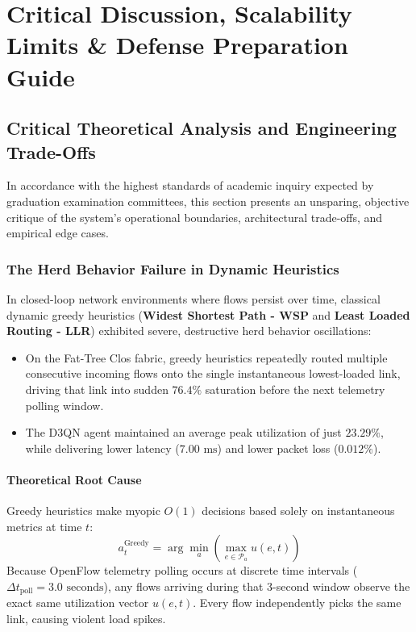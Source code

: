 \chapter{Critical Discussion, Scalability Limits \& Defense Preparation Guide}
\label{chap:defense}

\section{Critical Theoretical Analysis and Engineering Trade-Offs}
In accordance with the highest standards of academic inquiry expected by graduation examination committees, this section presents an unsparing, objective critique of the system's operational boundaries, architectural trade-offs, and empirical edge cases.

\subsection{The Herd Behavior Failure in Dynamic Heuristics}
In closed-loop network environments where flows persist over time, classical dynamic greedy heuristics (\textbf{Widest Shortest Path - WSP} and \textbf{Least Loaded Routing - LLR}) exhibited severe, destructive herd behavior oscillations:
\begin{itemize}
    \item On the Fat-Tree Clos fabric, greedy heuristics repeatedly routed multiple consecutive incoming flows onto the single instantaneous lowest-loaded link, driving that link into sudden $76.4\%$ saturation before the next telemetry polling window.
    \item The D3QN agent maintained an average peak utilization of just \textbf{$23.29\%$}, while delivering lower latency ($7.00\text{ ms}$) and lower packet loss ($0.012\%$).
\end{itemize}

\subsubsection{Theoretical Root Cause}
Greedy heuristics make myopic $O(1)$ decisions based solely on instantaneous metrics at time $t$:
\begin{equation}
    a_t^{\text{Greedy}} = \arg\min_a \left( \max_{e \in \mathcal{P}_a} u(e, t) \right)
\end{equation}
Because OpenFlow telemetry polling occurs at discrete time intervals ($\Delta t_{\text{poll}} = 3.0\text{ seconds}$), any flows arriving during that 3-second window observe the exact same utilization vector $u(e, t)$. Every flow independently picks the same link, causing violent load spikes.

